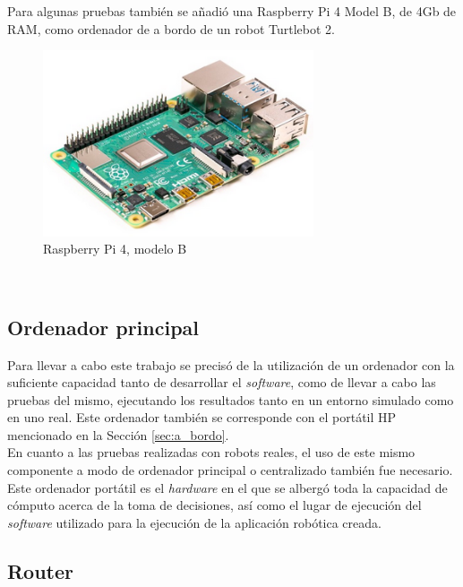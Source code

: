 Para algunas pruebas también se añadió una Raspberry Pi 4 Model B, de 4Gb de
RAM, como ordenador de a bordo de un robot Turtlebot 2.
\\

\begin{figure} [h!]
  \begin{center}
    \includegraphics[width=8cm]{figs/raspberry_pi_4b}
  \end{center}
  \caption{Raspberry Pi 4, modelo B \cite{raspberry_pi_4b}}
  \label{fig:raspberry_pi}
\end{figure}\


\subsection{Ordenador principal}
\label{sec:ordenador_principal}

Para llevar a cabo este trabajo se precisó de la utilización de un ordenador con
la suficiente capacidad tanto de desarrollar el \textit{software}, como de
llevar a cabo las pruebas del mismo, ejecutando los resultados tanto en un
entorno simulado como en uno real.
Este ordenador también se corresponde con el portátil HP mencionado en la
Sección \ref{sec:a_bordo}.
\\

En cuanto a las pruebas realizadas con robots reales, el uso de este mismo
componente a modo de ordenador principal o centralizado también fue necesario.
Este ordenador portátil es el \textit{hardware} en el que se albergó toda la
capacidad de cómputo acerca de la toma de decisiones, así como el lugar de
ejecución del \textit{software} utilizado para la ejecución de la aplicación
robótica creada.
\\

\subsection{Router}
\label{sec:router}

